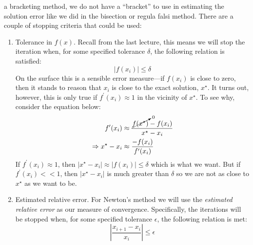  a bracketing method, we do not have a ``bracket'' to use in estimating the solution error like we did in the bisection or regula falsi method.  There are a couple of stopping criteria that could be used:
\begin{enumerate}
\item Tolerance in $f(x)$.  Recall from the last lecture, this means we will stop the iteration when, for some specified tolerance $\delta$, the following relation is satisfied:
\begin{equation}
\left| f(x_i) \right| \le \delta
\end{equation}
On the surface this is a sensible error measure---if $f(x_i)$ is close to zero, then it stands to reason that $x_i$ is close to the exact solution, $x^{\star}$.  It turns out, however, this is only true if $f^{\prime}(x_i) \approx 1$ in the vicinity of $x^{\star}$.  To see why, consider the equation below:
\begin{align*}
f^{\prime}(x_i) &\approx \frac{\cancelto{0}{f(x^{\star})}-f(x_i)}{x^{\star}-x_i} \\
\Rightarrow x^{\star} - x_i &\approx \frac{-f(x_i)}{f^{\prime}(x_i)}
\end{align*}
If $f^{\prime}(x_i) \approx 1$, then $|x^{\star} - x_{i}| \approx |f(x_i)| \le \delta$ which is what we want.  But if $f^{\prime}(x_{i}) < < 1$, then $|x^{\star} - x_{i}|$ is much greater than $\delta$ so we are not as close to $x^{\star}$ as we want to be.

\item Estimated relative error.  For Newton's method we will use the \emph{estimated relative error} as our measure of convergence.  Specifically, the iterations will be stopped when, for some specified tolerance $\epsilon$, the following relation is met:
\begin{equation}
\left|\frac{x_{i+1} - x_i}{x_i} \right| \le \epsilon
\end{equation}

\end{enumerate}

